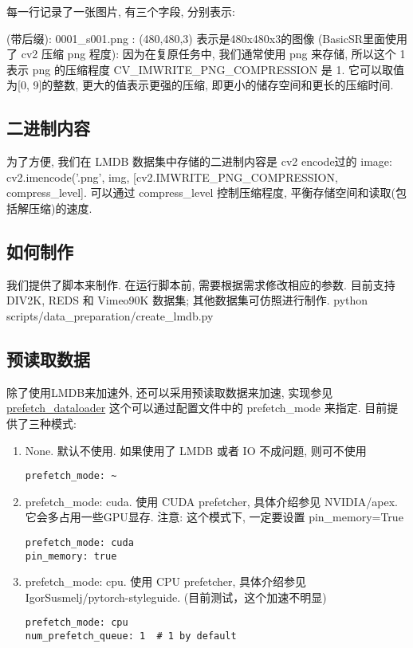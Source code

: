 \documentclass[../main.tex]{subfiles}
\begin{document}
每一行记录了一张图片, 有三个字段, 分别表示:
\begin{enumerate}
 (带后缀): 0001\_s001.png
: (480,480,3) 表示是480x480x3的图像
 (BasicSR里面使用了 cv2 压缩 png 程度): 因为在复原任务中, 我们通常使用 png 来存储, 所以这个 1 表示 png 的压缩程度 
CV\_IMWRITE\_PNG\_COMPRESSION 是 1. 它可以取值为[0, 9]的整数, 更大的值表示更强的压缩, 即更小的储存空间和更长的压缩时间.
\end{enumerate}

\subsection{二进制内容}
为了方便, 我们在 LMDB 数据集中存储的二进制内容是 cv2 encode过的 image: cv2.imencode('.png', img, [cv2.IMWRITE\_PNG\_COMPRESSION, compress\_level]. 可以通过 compress\_level 控制压缩程度, 平衡存储空间和读取(包括解压缩)的速度.


\subsection{如何制作}
我们提供了脚本来制作. 在运行脚本前, 需要根据需求修改相应的参数. 目前支持 DIV2K, REDS 和 Vimeo90K 数据集; 其他数据集可仿照进行制作.
python scripts/data\_preparation/create\_lmdb.py


\subsection{预读取数据}
除了使用LMDB来加速外, 还可以采用预读取数据来加速, 实现参见\href{https://github.com/XPixelGroup/BasicSR/blob/master/basicsr/data/prefetch_dataloader.py}{prefetch\_dataloader}
这个可以通过配置文件中的 prefetch\_mode 来指定. 目前提供了三种模式:

\begin{enumerate}
\item None. 默认不使用. 如果使用了 LMDB 或者 IO 不成问题, 则可不使用
\begin{verbatim}
prefetch_mode: ~
\end{verbatim}

\item prefetch\_mode: cuda. 使用 CUDA prefetcher, 具体介绍参见 NVIDIA/apex. 它会多占用一些GPU显存. 注意: 这个模式下, 一定要设置 pin\_memory=True
\begin{verbatim}
prefetch_mode: cuda
pin_memory: true
\end{verbatim}

\item prefetch\_mode: cpu. 使用 CPU prefetcher, 具体介绍参见 IgorSusmelj/pytorch-styleguide. (目前测试，这个加速不明显)
\begin{verbatim}
prefetch_mode: cpu
num_prefetch_queue: 1  # 1 by default
\end{verbatim}

\end{enumerate}
\end{document}
